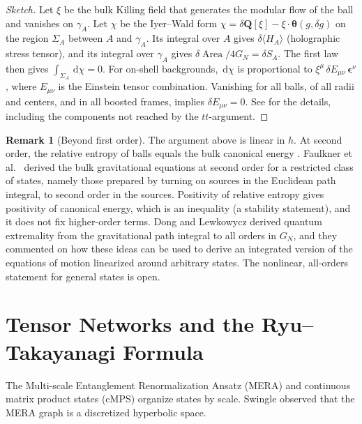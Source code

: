 \documentclass[11pt,a4paper,reqno]{amsart}
\theoremstyle{definition}
\newtheorem{remark}[theorem]{Remark}
\numberwithin{equation}{section}
\providecommand{\Area}{\operatorname{Area}}
\newcommand{\dif}{\,\mathrm{d}}
\begin{document}
\begin{proof}[Sketch]
Let $\xi$ be the bulk Killing field that generates the modular flow of the ball and vanishes on $\gamma_A$. Let $\chi$ be the Iyer--Wald form $\chi = \delta \mathbf{Q}[\xi] - \xi \cdot \boldsymbol{\theta}(g, \delta g)$ on the region $\Sigma_A$ between $A$ and $\gamma_A$. Its integral over $A$ gives $\delta\langle H_A\rangle$ (holographic stress tensor), and its integral over $\gamma_A$ gives $\delta\Area/4G_N = \delta S_A$. The first law then gives $\int_{\Sigma_A}\dif\chi = 0$. For on-shell backgrounds, $\dif\chi$ is proportional to $\xi^\mu\,\delta E_{\mu\nu}\,\boldsymbol{\epsilon}^\nu$, where $E_{\mu\nu}$ is the Einstein tensor combination. Vanishing for all balls, of all radii and centers, and in all boosted frames, implies $\delta E_{\mu\nu} = 0$. See \cite{faulkner2014gravitation} for the details, including the components not reached by the $tt$-argument.
\end{proof}

\begin{remark}[Beyond first order]
The argument above is linear in $h$. At second order, the relative entropy of balls equals the bulk canonical energy \cite{lashkari2016canonical}. Faulkner et al.\ \cite{faulkner2017nonlinear} derived the bulk gravitational equations at second order for a restricted class of states, namely those prepared by turning on sources in the Euclidean path integral, to second order in the sources. Positivity of relative entropy gives positivity of canonical energy, which is an inequality (a stability statement), and it does not fix higher-order terms. Dong and Lewkowycz \cite{dong2018entropy} derived quantum extremality from the gravitational path integral to all orders in $G_N$, and they commented on how these ideas can be used to derive an integrated version of the equations of motion linearized around arbitrary states. The nonlinear, all-orders statement for general states is open.
\end{remark}

\section{Tensor Networks and the Ryu--Takayanagi Formula}
\label{sec:ryu_takayanagi}

The Multi-scale Entanglement Renormalization Ansatz (MERA) and continuous matrix product states (cMPS) \cite{verstraete2010continuous} organize states by scale. Swingle \cite{swingle2012entanglement} observed that the MERA graph is a discretized hyperbolic space.
\end{document}

